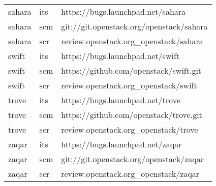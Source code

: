 \begin{center}
\begin{longtable}{|p{4cm}|p{1cm}|p{10cm}|}
sahara&its&https://bugs.launchpad.net/sahara\\ 
sahara&scm&git://git.openstack.org/openstack/sahara\\ 
sahara&scr&review.openstack.org\_openstack/sahara\\ 
swift&its&https://bugs.launchpad.net/swift\\ 
swift&scm&https://github.com/openstack/swift.git\\ 
swift&scr&review.openstack.org\_openstack/swift\\ 
trove&its&https://bugs.launchpad.net/trove\\ 
trove&scm&https://github.com/openstack/trove.git\\ 
trove&scr&review.openstack.org\_openstack/trove\\ 
zaqar&its&https://bugs.launchpad.net/zaqar\\ 
zaqar&scm&git://git.openstack.org/openstack/zaqar\\ 
zaqar&scr&review.openstack.org\_openstack/zaqar\
\hline
\end{longtable}
\end{center}

